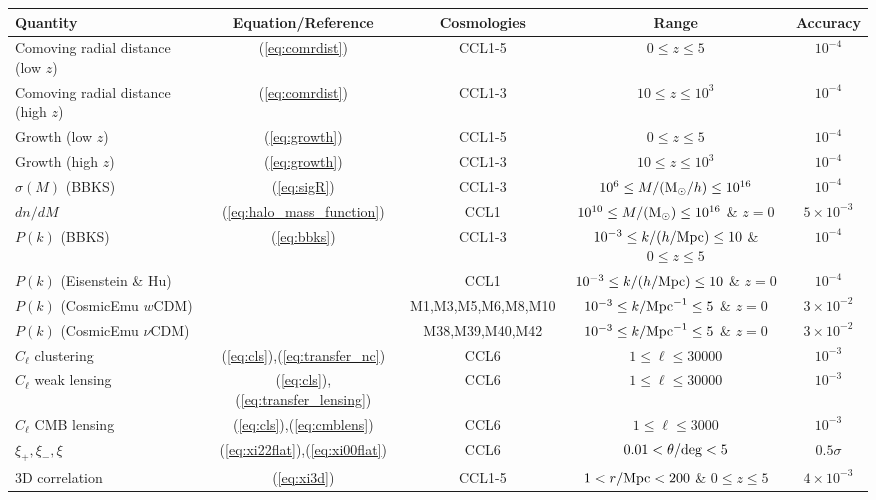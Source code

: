 
%
\begin{sidewaystable*}[!htp]
  \centering
  \begin{tabular}{ l|c c c c}
    \hline
    Quantity & Equation/Reference & Cosmologies & Range & Accuracy \\
    \hline
    Comoving radial distance (low $z$) & (\ref{eq:comrdist}) & CCL1-5 & $0\leq z\leq 5$ &  $10^{-4}$\\
    Comoving radial distance (high $z$) & (\ref{eq:comrdist}) & CCL1-3 & $10\leq z\leq 10^3$ &  $10^{-4}$\\
    Growth (low $z$) & (\ref{eq:growth}) & CCL1-5 &  $0\leq z\leq 5 $ &  $10^{-4}$\\
    Growth (high $z$) & (\ref{eq:growth}) & CCL1-3 & $10\leq z\leq 10^3$ &  $10^{-4}$\\
    $\sigma(M)$ (BBKS) & (\ref{eq:sigR}) & CCL1-3 &  $10^6\leq M/({\rm M}_\odot/h)\leq 10^{16}$ &  $10^{-4}$\\
    $dn/dM$ & (\ref{eq:halo_mass_function}) & CCL1 & $10^{10}\leq M/({\rm M}_\odot)\leq 10^{16}$ \& $z=0$ & $5\times 10^{-3}$\\
    $P(k)$ (BBKS) & (\ref{eq:bbks}) & CCL1-3 & $10^{-3}\leq k/(h/{\rm Mpc})\leq 10$ \& $0\leq z\leq 5$ &  $10^{-4}$\\
    $P(k)$ (Eisenstein \& Hu) & \citet{1998ApJ...496..605E}  & CCL1 & $10^{-3}\leq k/(h/{\rm Mpc})\leq 10$ \& $z=0$ & $10^{-4}$ \\
    $P(k)$ (CosmicEmu $w$CDM) & \citet{Lawrence17} & M1,M3,M5,M6,M8,M10 & $10^{-3}\leq k/{\rm Mpc}^{-1}\leq 5$ \& $z=0$  & $3\times 10^{-2}$ \\
    $P(k)$ (CosmicEmu $\nu$CDM) & \citet{Lawrence17} & M38,M39,M40,M42 & $10^{-3}\leq k/{\rm Mpc}^{-1}\leq 5$ \& $z=0$ & $3\times 10^{-2}$ \\
    $C_\ell$ clustering & (\ref{eq:cls}),(\ref{eq:transfer_nc})& CCL6 &$1 \leq \ell\leq 30000$ &  $10^{-3}$\\
    $C_\ell$ weak lensing & (\ref{eq:cls}),(\ref{eq:transfer_lensing})& CCL6 &$1 \leq \ell\leq 30000$ &  $10^{-3}$\\
    $C_\ell$ CMB lensing &(\ref{eq:cls}),(\ref{eq:cmblens}) & CCL6 & $1 \leq \ell\leq 3000$& $10^{-3}$ \\
    $\xi_+,\xi_-,\xi$ & (\ref{eq:xi22flat}),(\ref{eq:xi00flat}) & CCL6 & $0.01< \theta/{\rm deg}< 5$&  $0.5\sigma$\\
    3D correlation & (\ref{eq:xi3d}) & CCL1-5 & $1<r/{\rm Mpc}<200$ \& $0 \leq z \leq 5$& $4\times 10^{-3}$  \\

\end{tabular}
\end{sidewaystable*}
